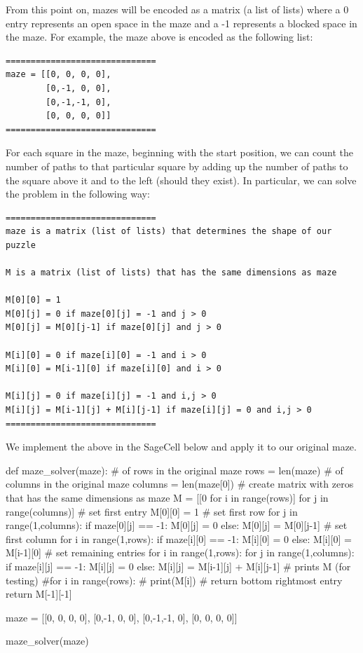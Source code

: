 \documentclass{ximera}
\begin{document}
From this point on, mazes will be encoded as a matrix (a list of lists) where a 0 entry represents an open space in the maze and a -1 represents a blocked space in the maze. For example, the maze above is encoded as the following list:

\begin{verbatim}
==============================
maze = [[0, 0, 0, 0],
        [0,-1, 0, 0],
        [0,-1,-1, 0],
        [0, 0, 0, 0]]
==============================
\end{verbatim}

For each square in the maze, beginning with the start position, we can count the number of paths to that particular square by adding up the number of paths to the square above it and to the left (should they exist). In particular, we can solve the problem in the following way:
\begin{verbatim}
==============================
maze is a matrix (list of lists) that determines the shape of our puzzle

M is a matrix (list of lists) that has the same dimensions as maze

M[0][0] = 1
M[0][j] = 0 if maze[0][j] = -1 and j > 0
M[0][j] = M[0][j-1] if maze[0][j] and j > 0

M[i][0] = 0 if maze[i][0] = -1 and i > 0
M[i][0] = M[i-1][0] if maze[i][0] and i > 0

M[i][j] = 0 if maze[i][j] = -1 and i,j > 0
M[i][j] = M[i-1][j] + M[i][j-1] if maze[i][j] = 0 and i,j > 0
==============================
\end{verbatim}

We implement the above in the SageCell below and apply it to our original maze.
\begin{sageCell}
def maze_solver(maze):
        # of rows in the original maze
        rows = len(maze)
        # of columns in the original maze
        columns = len(maze[0])
        # create matrix with zeros that has the same dimensions as maze
        M = [[0 for i in range(rows)] for j in range(columns)]
        # set first entry
        M[0][0] = 1
        # set first row
        for j in range(1,columns):
                if maze[0][j] == -1:
                        M[0][j] = 0
                else:
                        M[0][j] = M[0][j-1]
        # set first column
        for i in range(1,rows):
                if maze[i][0] == -1:
                        M[i][0] = 0
                else:
                        M[i][0] = M[i-1][0]
        # set remaining entries
        for i in range(1,rows):
                for j in range(1,columns):
                        if maze[i][j] == -1:
                                M[i][j] = 0
                        else:
                                M[i][j] = M[i-1][j] + M[i][j-1]
        # prints M (for testing)
        #for i in range(rows):
        #    print(M[i])
        # return bottom rightmost entry
        return M[-1][-1]

maze = [[0, 0, 0, 0],
        [0,-1, 0, 0],
        [0,-1,-1, 0],
        [0, 0, 0, 0]]

maze_solver(maze)
\end{sageCell}
\end{document}
